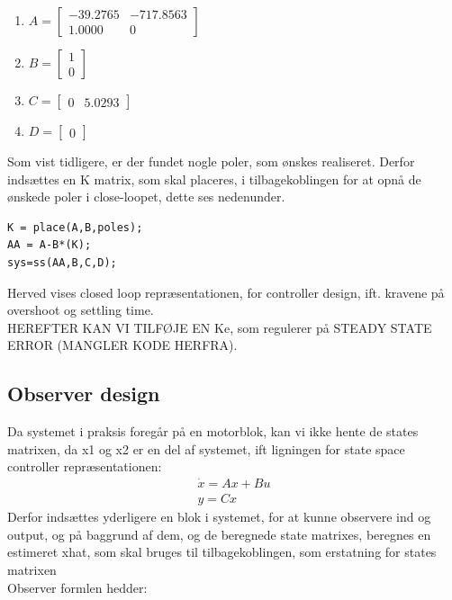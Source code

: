 \begin{enumerate}
	
	\item
	$
	A = 
	\begin{bmatrix}
	
	-39.2765 & -717.8563 \\
	1.0000     &    0
	\end{bmatrix}
	$
	\item
	$
	B = 
	\begin{bmatrix}
	
	1\\
	0
	\end{bmatrix}
	$    
	
	\item 
	$
	C = 
	\begin{bmatrix}
	
	0  &  5.0293
	\end{bmatrix}
	$    
	\item
	$
	D = 
	\begin{bmatrix}
	
	0  
	\end{bmatrix}
	$  
\end{enumerate}      
Som vist tidligere, er der fundet nogle poler, som ønskes realiseret. Derfor indsættes en K matrix, som skal placeres, i tilbagekoblingen for at opnå de ønskede poler i close-loopet, dette ses nedenunder. 

\begin{lstlisting}[frame=single]
K = place(A,B,poles);
AA = A-B*(K);
sys=ss(AA,B,C,D);
\end{lstlisting}

Herved vises closed loop repræsentationen, for controller design, ift. kravene på overshoot og settling time.\\


HEREFTER KAN VI TILFØJE EN Ke, som regulerer på STEADY STATE ERROR (MANGLER KODE HERFRA). 



\subsection{Observer design}
Da systemet i praksis foregår på en motorblok, kan vi ikke hente de states matrixen, da x1 og x2 er en del  af systemet, ift ligningen for state space controller repræsentationen: 
\begin{gather}
\dot{x}=Ax+Bu \\
y=Cx
\end{gather}
Derfor indsættes yderligere en blok i systemet, for at kunne observere ind og output, og på baggrund af dem, og de beregnede state matrixes, beregnes en estimeret xhat, som skal bruges til tilbagekoblingen, som erstatning for states matrixen \\
Observer formlen hedder:



